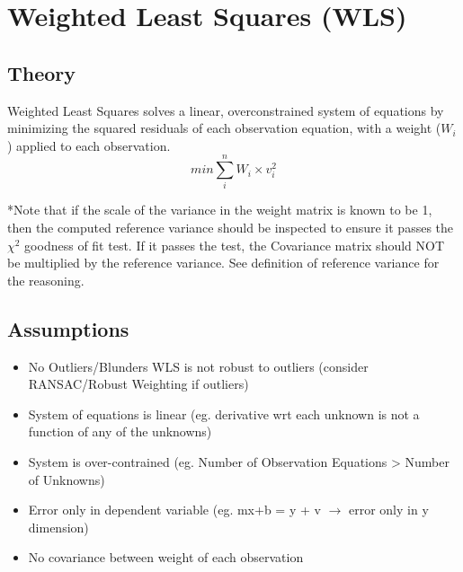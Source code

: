 \section{Weighted Least Squares (WLS)}
\subsection{Theory}
Weighted Least Squares solves a linear, overconstrained system of equations by minimizing the squared residuals of each observation equation, with a weight ($W_i$) applied to each observation.
\[
min \sum_{i}^{n} W_i\times v_i^2
\]

*Note that if the scale of the variance in the weight matrix is known to be 1, then the computed reference variance should be inspected to ensure it passes the $\chi^2$ goodness of fit test.  If it passes the test, the Covariance matrix should NOT be multiplied by the reference variance.  See definition of reference variance for the reasoning.

\subsection{Assumptions}
\begin{itemize}
	\item No Outliers/Blunders WLS is not robust to outliers (consider RANSAC/Robust Weighting if outliers)
	\item System of equations is linear (eg. derivative wrt each unknown is not a function of any of the unknowns)
	\item System is over-contrained (eg. Number of Observation Equations > Number of Unknowns)
	\item Error only in dependent variable (eg. mx+b = y + v $\rightarrow$ error only in y dimension)
	\item No covariance between weight of each observation
\end{itemize}
